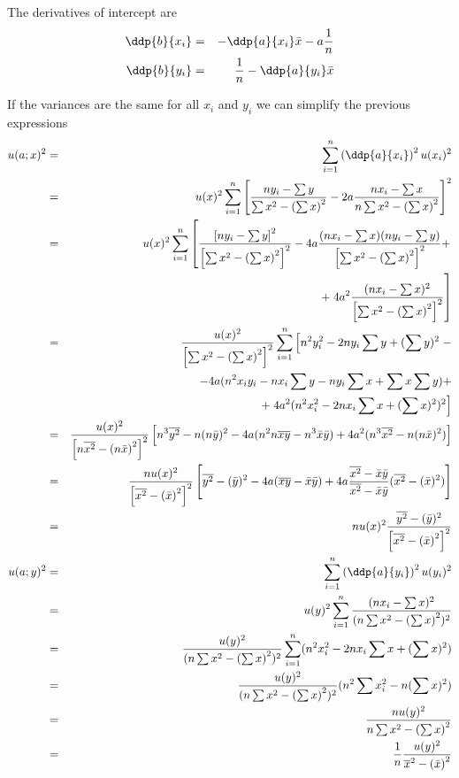 The derivatives of intercept  are
\begin{eqnarray*}
 \ddp{b}{x_i} &=& - \ddp{a}{x_i} \bar x - a \frac1n \\
 \ddp{b}{y_i} &=& \frac1n - \ddp{a}{y_i} \bar x
\end{eqnarray*}

If the variances are the same for all $x_i$ and $y_i$ we can simplify the previous expressions
\begin{eqnarray*}
 u(a;x)^2 &=& \sum_{i=1}^n \left(\ddp{a}{x_i}\right)^2 u(x_i)^2 \\
 &=& u(x)^2 \sum_{i=1}^n \left[\frac{n y_i - \sum y}{\sum x^2 - \left( \sum x\right)^2} - 2a \frac{n x_i - \sum x}{n \sum x^2 - \left( \sum x\right)^2} \right]^2 \\
 &=& u(x)^2 \sum_{i=1}^n \left[ \frac{\left[n y_i - \sum y\right]^2}{\left[\sum x^2 - \left( \sum x\right)^2\right]^2} 
 - 4a \frac{(nx_i - \sum x)(ny_i - \sum y)}{\left[\sum x^2 - \left( \sum x\right)^2\right]^2} + \right. \\
&& + \left. 4 a^2 \frac{(nx_i - \sum x)^2}{\left[\sum x^2 - \left( \sum x\right)^2\right]^2} 
 \right]\\
 &=& \frac{u(x)^2}{\left[\sum x^2 - \left( \sum x\right)^2\right]^2} \sum_{i=1}^n \left[ n^2 y_i^2 - 2 n y_i \sum y + (\sum y)^2  \right. - \\
 &&- 4a (n^2 x_i y_i - n x_i \sum y - n y_i \sum x + \sum x \sum y) +  \\
&& + \left. 4 a^2 (n^2 x_i^2 -2nx_i \sum x+ (\sum x)^2)^2 \right] \\
 &=& \frac{u(x)^2}{\left[n \overline{x^2} - \left( n \bar x\right)^2\right]^2}
 \left[ n^3 \overline{y^2} - n (n \bar y)^2 
 - 4a ( n^2 n \overline{xy} - n^3 \bar x \bar y)   +
  4 a^2 (n^3 \overline{x^2} - n (n\bar x)^2) \right] \\
 &=& \frac{n u(x)^2}{\left[\overline{x^2} - \left( \bar x\right)^2\right]^2} 
 \left[ \overline{y^2} - ( \bar y)^2 
 - 4a (  \overline{xy} - \bar x \bar y)   +
  4 a \frac{\overline{x^2} - \bar x \bar y}{\overline{x^2} - \bar x \bar y} (\overline{x^2} - (\bar x)^2) \right]\\
  &=& n u(x)^2\frac{\overline{y^2} - ( \bar y)^2}{\left[\overline{x^2} - \left( \bar x\right)^2\right]^2}  \\
 u(a;y)^2 &=& \sum_{i=1}^n \left(\ddp{a}{y_i}\right)^2 u(y_i)^2 \\
 &=& u(y)^2 \sum_{i=1}^n \frac{(n x_i - \sum x)^2}{(n\sum x^2 - \left( \sum x\right)^2)^2} \\
 &=& \frac{u(y)^2}{(n\sum x^2 - \left( \sum x\right)^2)^2} \sum_{i=1}^n ( n^2 x_i^2 - 2n x_i \sum x + (\sum x)^2) \\
 &=& \frac{u(y)^2}{(n\sum x^2 - \left( \sum x\right)^2)^2} ( n^2 \sum x_i^2 - n (\sum x)^2) \\
 &=& \frac{n u(y)^2}{n\sum x^2 - \left( \sum x\right)^2} \\
 &=& \frac1n \frac{ u(y)^2}{\overline x^2 - \left( \bar x\right)^2} 
 \end{eqnarray*}
